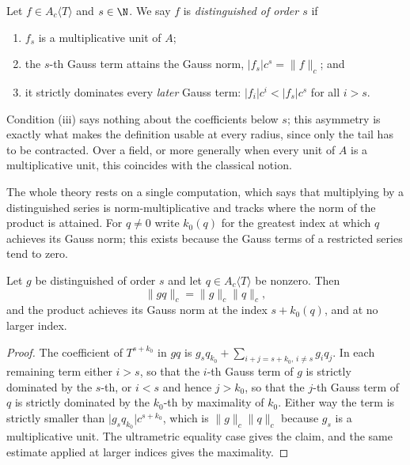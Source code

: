 \begin{definition}
  \label{def:ismuldistinguished}
  \leanok
  Let $f \in A_c\langle T \rangle$ and $s \in \N$.  We say $f$ is \emph{distinguished of order
  $s$} if
  \begin{enumerate}
    \item $f_s$ is a multiplicative unit of $A$;
    \item the $s$-th Gauss term attains the Gauss norm, $\lvert f_s \rvert c^s = \lVert f
      \rVert_c$; and
    \item it strictly dominates every \emph{later} Gauss term: $\lvert f_i \rvert c^i < \lvert
      f_s \rvert c^s$ for all $i > s$.
  \end{enumerate}
\end{definition}

Condition (iii) says nothing about the coefficients below $s$; this asymmetry is exactly what
makes the definition usable at every radius, since only the tail has to be contracted.  Over a
field, or more generally when every unit of $A$ is a multiplicative unit, this coincides with the
classical notion.

The whole theory rests on a single computation, which says that multiplying by a distinguished
series is norm-multiplicative and tracks where the norm of the product is attained.  For $q \neq
0$ write $k_0(q)$ for the greatest index at which $q$ achieves its Gauss norm; this exists
because the Gauss terms of a restricted series tend to zero.

\begin{lemma}
  \label{lem:martin126}
  \leanok
  Let $g$ be distinguished of order $s$ and let $q \in A_c\langle T\rangle$ be nonzero.  Then
  \[
    \lVert g q \rVert_c = \lVert g \rVert_c \lVert q \rVert_c,
  \]
  and the product achieves its Gauss norm at the index $s + k_0(q)$, and at no larger index.
\end{lemma}

\begin{proof}
  \leanok
  The coefficient of $T^{s + k_0}$ in $gq$ is $g_s q_{k_0} + \sum_{i + j = s + k_0, \, i \neq s}
  g_i q_j$.  In each remaining term either $i > s$, so that the $i$-th Gauss term of $g$ is
  strictly dominated by the $s$-th, or $i < s$ and hence $j > k_0$, so that the $j$-th Gauss term
  of $q$ is strictly dominated by the $k_0$-th by maximality of $k_0$.  Either way the term is
  strictly smaller than $\lvert g_s q_{k_0}\rvert c^{s + k_0}$, which is $\lVert g \rVert_c
  \lVert q \rVert_c$ because $g_s$ is a multiplicative unit.  The ultrametric equality case gives
  the claim, and the same estimate applied at larger indices gives the maximality.
\end{proof}


